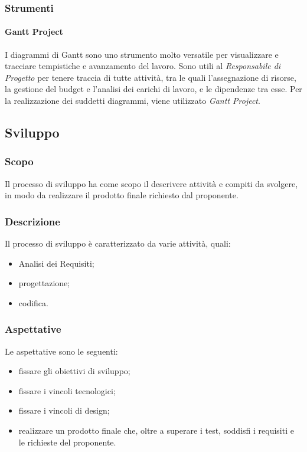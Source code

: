 \subsubsection{Strumenti}

\paragraph{Gantt Project}

I diagrammi di Gantt sono uno strumento molto versatile per visualizzare e tracciare tempistiche e avanzamento del lavoro.  Sono utili al \textit{Responsabile di Progetto} per tenere traccia di tutte attività, tra le quali l'assegnazione di risorse,  la gestione del budget e l'analisi dei carichi di lavoro, e le dipendenze tra esse.  Per la realizzazione dei suddetti diagrammi, viene utilizzato \textit{Gantt Project}.

\subsection{Sviluppo}

\subsubsection{Scopo}

Il processo di sviluppo ha come scopo il descrivere attività e compiti da svolgere,  in modo da realizzare il prodotto finale richiesto dal proponente.

\subsubsection{Descrizione}

Il processo di sviluppo è caratterizzato da varie attività,  quali:
\begin{itemize}

\item Analisi dei Requisiti;

\item progettazione;

\item codifica.

\end{itemize}

\subsubsection{Aspettative}

Le aspettative sono le seguenti:
\begin{itemize}

\item fissare gli obiettivi di sviluppo;

\item fissare i vincoli tecnologici;

\item fissare i vincoli di design;

\item realizzare un prodotto finale che,  oltre a superare i test,  soddisfi i requisiti e le richieste del proponente.

\end{itemize}

